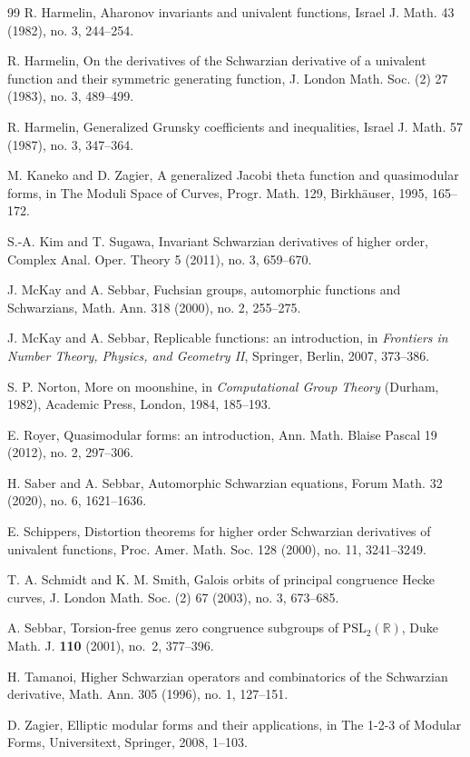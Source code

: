 \documentclass[11pt]{amsart}
\theoremstyle{definition}
\theoremstyle{remark}
\numberwithin{equation}{section}
\begin{document}
\begin{thebibliography}{99}
R. Harmelin,
Aharonov invariants and univalent functions,
Israel J. Math. 43 (1982), no. 3, 244--254.

R. Harmelin,
On the derivatives of the Schwarzian derivative of a univalent function and their symmetric generating function,
J. London Math. Soc. (2) 27 (1983), no. 3, 489--499.

R. Harmelin,
Generalized Grunsky coefficients and inequalities,
Israel J. Math. 57 (1987), no. 3, 347--364.

M. Kaneko and D. Zagier,
A generalized Jacobi theta function and quasimodular forms,
in The Moduli Space of Curves, Progr. Math. 129, Birkh\"auser, 1995, 165--172.

S.-A. Kim and T. Sugawa,
Invariant Schwarzian derivatives of higher order,
Complex Anal. Oper. Theory 5 (2011), no. 3, 659--670.

J. McKay and A. Sebbar,
Fuchsian groups, automorphic functions and Schwarzians,
Math. Ann. 318 (2000), no. 2, 255--275.

J. McKay and A. Sebbar,
Replicable functions: an introduction,
in \emph{Frontiers in Number Theory, Physics, and Geometry II},
Springer, Berlin, 2007, 373--386.

S. P. Norton,
More on moonshine,
in \emph{Computational Group Theory} (Durham, 1982), Academic Press, London, 1984, 185--193.

E. Royer,
Quasimodular forms: an introduction,
Ann. Math. Blaise Pascal 19 (2012), no. 2, 297--306.

H. Saber and A. Sebbar,
Automorphic Schwarzian equations,
Forum Math. 32 (2020), no. 6, 1621--1636.

E. Schippers,
Distortion theorems for higher order Schwarzian derivatives of univalent functions,
Proc. Amer. Math. Soc. 128 (2000), no. 11, 3241--3249.

T. A. Schmidt and K. M. Smith,
Galois orbits of principal congruence Hecke curves,
J. London Math. Soc. (2) 67 (2003), no. 3, 673--685.

A. Sebbar,
Torsion-free genus zero congruence subgroups of $\mathrm{PSL}_2(\mathbb R)$,
Duke Math. J. \textbf{110} (2001), no.~2, 377--396.

H. Tamanoi,
Higher Schwarzian operators and combinatorics of the Schwarzian derivative,
Math. Ann. 305 (1996), no. 1, 127--151.

D. Zagier,
Elliptic modular forms and their applications,
in The 1-2-3 of Modular Forms, Universitext, Springer, 2008, 1--103.

\end{thebibliography}
\end{document}
